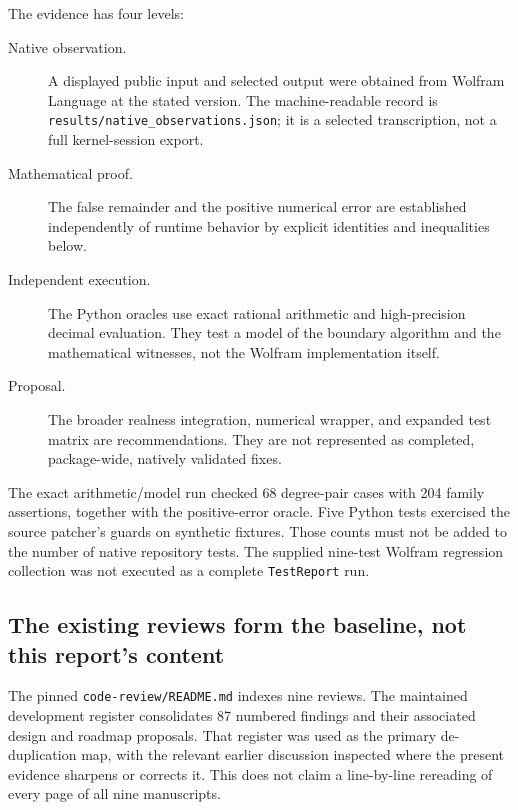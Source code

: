 \documentclass[11pt,letterpaper]{article}
\newcommand{\code}[1]{{\small\nolinkurl{#1}}}
\begin{document}
The evidence has four levels:
\begin{description}
\item[Native observation.] A displayed public input and selected output were obtained from Wolfram Language at the stated version. The machine-readable record is \code{results/native_observations.json}; it is a selected transcription, not a full kernel-session export.
\item[Mathematical proof.] The false remainder and the positive numerical error are established independently of runtime behavior by explicit identities and inequalities below.
\item[Independent execution.] The Python oracles use exact rational arithmetic and high-precision decimal evaluation. They test a model of the boundary algorithm and the mathematical witnesses, not the Wolfram implementation itself.
\item[Proposal.] The broader realness integration, numerical wrapper, and expanded test matrix are recommendations. They are not represented as completed, package-wide, natively validated fixes.
\end{description}

The exact arithmetic/model run checked 68 degree-pair cases with 204 family assertions, together with the positive-error oracle. Five Python tests exercised the source patcher's guards on synthetic fixtures. Those counts must not be added to the number of native repository tests. The supplied nine-test Wolfram regression collection was not executed as a complete \code{TestReport} run.

\subsection{The existing reviews form the baseline, not this report's content}
The pinned \code{code-review/README.md} indexes nine reviews. The maintained development register consolidates 87 numbered findings and their associated design and roadmap proposals. That register was used as the primary de-duplication map, with the relevant earlier discussion inspected where the present evidence sharpens or corrects it. This does not claim a line-by-line rereading of every page of all nine manuscripts.\cite{review-index,status,review2}
\end{document}
